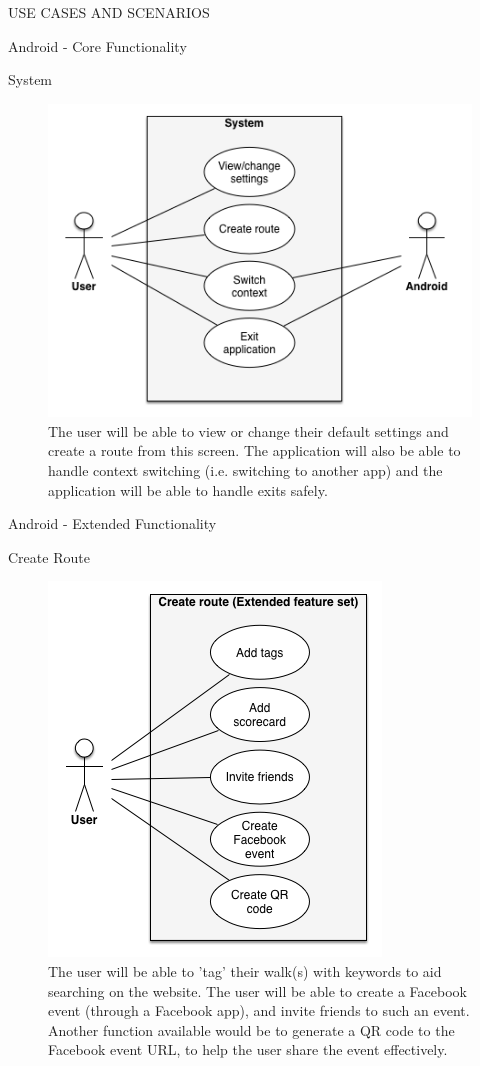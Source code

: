 \documentclass{article}
\begin{document}
\begin{section}{USE CASES AND SCENARIOS}
\begin{subsection}{Android - Core Functionality}
			\clearpage
			\begin{subsubsection}{System}
				\begin{figure}[h!]
					\begin{center}
						\includegraphics[height=0.55\columnwidth]{./Diagrams/UseCase/Android/Core/System.png}
					\end{center}
					\caption{The user will be able to view or change their default settings and create a route from this screen. The application will also be able to handle context switching (i.e. switching to another app) and the application will be able to handle exits safely.}
				\end{figure}
			\end{subsubsection}
		\end{subsection}
		
		\clearpage
		\begin{subsection}{Android - Extended Functionality}
			\begin{subsubsection}{Create Route}
				\begin{figure}[h!]
					\begin{center}
						\includegraphics[height=0.55\columnwidth]{./Diagrams/UseCase/Android/Extended/CreateRoute_Extended.png}
					\end{center}
					\caption{The user will be able to 'tag' their walk(s) with keywords to aid searching on the website. The user will be able to create a Facebook event (through a Facebook app), and invite friends to such an event. Another function available would be to generate a QR code to the Facebook event URL, to help the user share the event effectively.}
				\end{figure}
			\end{subsubsection}
			

\end{subsection}
\end{section}
\end{document}

